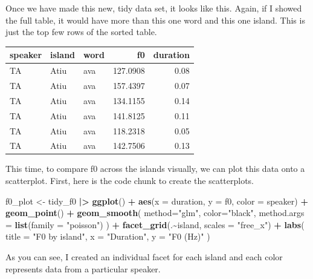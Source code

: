 \documentclass[
  ,man,floatsintext]{apa6}
\newenvironment{Shaded}{\begin{snugshade}}{\end{snugshade}}
\newcommand{\AttributeTok}[1]{\textcolor[rgb]{0.13,0.29,0.53}{#1}}
\newcommand{\FunctionTok}[1]{\textcolor[rgb]{0.13,0.29,0.53}{\textbf{#1}}}
\newcommand{\NormalTok}[1]{#1}
\newcommand{\OtherTok}[1]{\textcolor[rgb]{0.56,0.35,0.01}{#1}}
\newcommand{\SpecialCharTok}[1]{\textcolor[rgb]{0.81,0.36,0.00}{\textbf{#1}}}
\newcommand{\StringTok}[1]{\textcolor[rgb]{0.31,0.60,0.02}{#1}}
\begin{document}
Once we have made this new, tidy data set, it looks like this. Again, if I showed the full table, it would have more than this one word and this one island. This is just the top few rows of the sorted table.

\begin{tabular}{l|l|l|r|r}
\hline
speaker & island & word & f0 & duration\\
\hline
TA & Atiu & ava & 127.0908 & 0.08\\
\hline
TA & Atiu & ava & 157.4397 & 0.07\\
\hline
TA & Atiu & ava & 134.1155 & 0.14\\
\hline
TA & Atiu & ava & 141.8125 & 0.11\\
\hline
TA & Atiu & ava & 118.2318 & 0.05\\
\hline
TA & Atiu & ava & 142.7506 & 0.13\\
\hline
\end{tabular}

This time, to compare f0 across the islands visually, we can plot this data onto a scatterplot. First, here is the code chunk to create the scatterplots.

\begin{Shaded}
\begin{Highlighting}[]
\NormalTok{f0\_plot }\OtherTok{\textless{}{-}}\NormalTok{ tidy\_f0 }\SpecialCharTok{|\textgreater{}}
  \FunctionTok{ggplot}\NormalTok{() }\SpecialCharTok{+} 
  \FunctionTok{aes}\NormalTok{(}\AttributeTok{x =}\NormalTok{ duration, }\AttributeTok{y =}\NormalTok{ f0, }\AttributeTok{color =}\NormalTok{ speaker) }\SpecialCharTok{+}
  \FunctionTok{geom\_point}\NormalTok{() }\SpecialCharTok{+}
  \FunctionTok{geom\_smooth}\NormalTok{(}
    \AttributeTok{method=}\StringTok{"glm"}\NormalTok{,}
    \AttributeTok{color=}\StringTok{"black"}\NormalTok{,}
    \AttributeTok{method.args =} \FunctionTok{list}\NormalTok{(}\AttributeTok{family =} \StringTok{"poisson"}\NormalTok{)}
\NormalTok{  ) }\SpecialCharTok{+}
  \FunctionTok{facet\_grid}\NormalTok{(.}\SpecialCharTok{\textasciitilde{}}\NormalTok{island,}
             \AttributeTok{scales =} \StringTok{"free\_x"}\NormalTok{) }\SpecialCharTok{+}
  \FunctionTok{labs}\NormalTok{(}
    \AttributeTok{title =} \StringTok{"F0 by island"}\NormalTok{, }
    \AttributeTok{x =} \StringTok{"Duration"}\NormalTok{, }
    \AttributeTok{y =} \StringTok{"F0 (Hz)"}
\NormalTok{  ) }
\end{Highlighting}
\end{Shaded}

As you can see, I created an individual facet for each island and each color represents data from a particular speaker.
\end{document}
